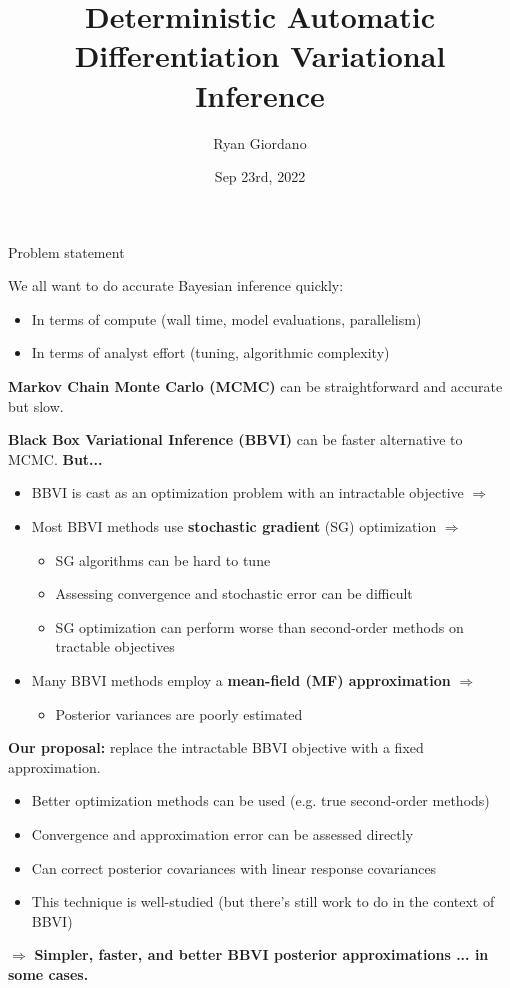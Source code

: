 \documentclass[8pt]{beamer}\usepackage[]{graphicx}\usepackage[]{color}
\title{Deterministic Automatic Differentiation Variational Inference}
\author{Ryan Giordano}
\date{Sep 23rd, 2022}
\institute{Massachusetts Institute of Technology}
\begin{document}

\begin{frame}{Problem statement}

We all want to do accurate Bayesian inference quickly:
%
\begin{itemize}
    \item In terms of compute (wall time, model evaluations, parallelism)
    \item In terms of analyst effort (tuning, algorithmic complexity)
\end{itemize}
%
\textbf{Markov Chain Monte Carlo (MCMC)} can be
straightforward and accurate but slow.

\vspace{-0.5em}
\hrulefill

\textbf{Black Box Variational Inference (BBVI)} can be faster alternative to MCMC.
%
\textbf{But...}

%
\begin{itemize}
    \item BBVI is cast as an optimization problem with an intractable objective $\Rightarrow$
    \item Most BBVI methods use \textbf{stochastic gradient} (SG) optimization $\Rightarrow$
    \begin{itemize}
        \item SG algorithms can be hard to tune
        \item Assessing convergence and stochastic error can be difficult
        \item SG optimization can perform worse than second-order methods on tractable objectives
    \end{itemize}
    \item Many BBVI methods employ a \textbf{mean-field (MF) approximation} $\Rightarrow$
    \begin{itemize}
        \item Posterior variances are poorly estimated
    \end{itemize}
\end{itemize}
%
\vspace{-0.5em}
\hrulefill

\textbf{Our proposal:}
replace the intractable BBVI objective with a fixed approximation.
%
\begin{itemize}
    \item Better optimization methods can be used (e.g. true second-order methods)
    \item Convergence and approximation error can be assessed directly
    \item Can correct posterior covariances with linear response covariances
    \item This technique is well-studied (but there's still work to do in the context of BBVI)
\end{itemize}
%
$\Rightarrow$
\textbf{Simpler, faster, and better BBVI posterior approximations ... in some cases.}
%
\end{frame}
\end{document}
